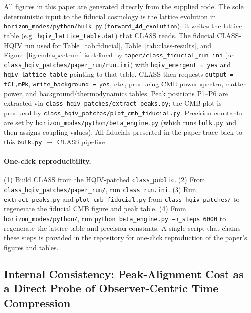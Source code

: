 \documentclass[12pt,a4paper]{article}
\begin{document}
All figures in this paper are generated directly from the supplied code. The sole deterministic input to the fiducial cosmology is the lattice evolution in \texttt{horizon\_modes/python/bulk.py} (\texttt{forward\_4d\_evolution}); it writes the lattice table (e.g.\ \texttt{hqiv\_lattice\_table.dat}) that CLASS reads. The fiducial CLASS-HQIV run used for Table~\ref{tab:fiducial}, Table~\ref{tab:class-results}, and Figure~\ref{fig:cmb-spectrum} is defined by \texttt{paper/class\_fiducial\_run.ini} (or \texttt{class\_hqiv\_patches/paper\_run/run.ini}) with \texttt{hqiv\_emergent = yes} and \texttt{hqiv\_lattice\_table} pointing to that table. CLASS then requests \texttt{output = tCl,mPk}, \texttt{write\_background = yes}, etc., producing CMB power spectra, matter power, and background/thermodynamics tables. Peak positions P1--P6 are extracted via \texttt{class\_hqiv\_patches/extract\_peaks.py}; the CMB plot is produced by \texttt{class\_hqiv\_patches/plot\_cmb\_fiducial.py}. Precision constants are set by \texttt{horizon\_modes/python/beta\_engine.py} (which runs \texttt{bulk.py} and then assigns coupling values). All fiducials presented in the paper trace back to this \texttt{bulk.py} $\to$ CLASS pipeline \citep{hqiv_repo}.

\paragraph{One-click reproducibility.}
(1) Build CLASS from the HQIV-patched \texttt{class\_public}. (2) From \texttt{class\_hqiv\_patches/paper\_run/}, run \texttt{class run.ini}. (3) Run \texttt{extract\_peaks.py} and \texttt{plot\_cmb\_fiducial.py} from \texttt{class\_hqiv\_patches/} to regenerate the fiducial CMB figure and peak table. (4) From \texttt{horizon\_modes/python/}, run \texttt{python beta\_engine.py --n\_steps 6000} to regenerate the lattice table and precision constants. A single script that chains these steps is provided in the repository for one-click reproduction of the paper's figures and tables.

\subsection{Internal Consistency: Peak-Alignment Cost as a Direct Probe of Observer-Centric Time Compression}
\end{document}
